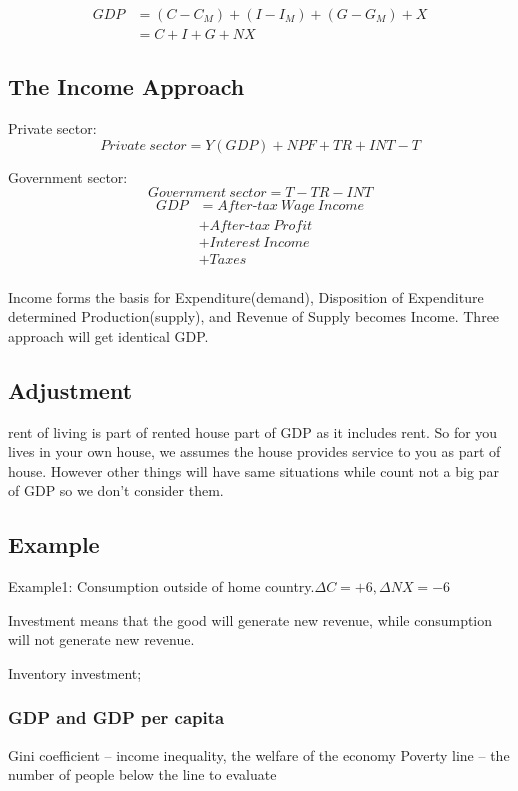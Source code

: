 \documentclass[10pt, a4paper]{article}
\begin{document}
                \begin{align*}
                    GDP &= (C - C_M) + (I - I_M) + (G - G_M) + X \\
                    &= C + I + G + NX
                \end{align*}

        \subsection{The Income Approach}
            Private sector: 
            $$Private\ sector = Y(GDP) + NPF + TR + INT - T$$

            Government sector: 
            $$Government\ sector = T - TR - INT$$
            \begin{align*}
                GDP &= After\text{-}tax\ Wage\ Income \\
                    &+ After\text{-}tax\ Profit \\
                    &+ Interest\ Income\\
                    &+ Taxes\\
            \end{align*}

            Income forms the basis for Expenditure(demand), Disposition of Expenditure determined Production(supply), and Revenue of Supply becomes Income. Three approach will get identical GDP.

            \subsection{Adjustment}
            rent of living is part of rented house part of GDP as it includes rent. So for you lives in your own house, we assumes the house provides service to you as part of house. However other things will have same situations while count not a big par of GDP so we don't consider them.
        
        \subsection{Example}
            Example1: Consumption outside of home country.$\Delta C = +6, \Delta NX = -6$
            
            Investment means that the good will generate new revenue, while consumption will not generate new revenue. 

            Inventory investment;
        \subsubsection{GDP and GDP per capita}
            Gini coefficient -- income inequality, the welfare of the economy
            Poverty line -- the number of people below the line to evaluate
\end{document}
